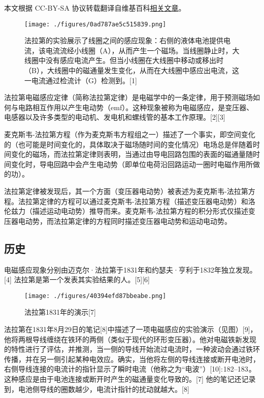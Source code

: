 
本文根据 CC-BY-SA 协议转载翻译自维基百科\href{https://en.wikipedia.org/wiki/Faraday\%27s_law_of_induction}{相关文章}。

\begin{figure}[ht]
\centering
\texttt{[image: ./figures/0ad787ae5c515839.png]}
\caption{法拉第的实验展示了线圈之间的感应现象：右侧的液体电池提供电流，该电流流经小线圈（A），从而产生一个磁场。当线圈静止时，大线圈中没有感应电流产生。但当小线圈在大线圈中移动或移出时（B），大线圈中的磁通量发生变化，从而在大线圈中感应出电流，这一电流通过检流计（G）检测到。[1]} \label{fig_FLDL_1}
\end{figure}
法拉第电磁感应定律（简称法拉第定律）是电磁学中的一条定律，用于预测磁场如何与电路相互作用以产生电动势（emf）。这种现象被称为电磁感应，是变压器、电感器以及许多类型的电动机、发电机和螺线管的基本工作原理。[2][3]

麦克斯韦-法拉第方程（作为麦克斯韦方程组之一）描述了一个事实，即空间变化的（也可能是时间变化的，具体取决于磁场随时间的变化情况）电场总是伴随着时间变化的磁场，而法拉第定律则表明，当通过由导电回路包围的表面的磁通量随时间变化时，导电回路中会产生电动势（即单位电荷沿回路运动一圈时电磁作用所做的功）。

法拉第定律被发现后，其一个方面（变压器电动势）被表述为麦克斯韦-法拉第方程。法拉第定律的方程可以通过麦克斯韦-法拉第方程（描述变压器电动势）和洛伦兹力（描述运动电动势）推导而来。麦克斯韦-法拉第方程的积分形式仅描述变压器电动势，而法拉第定律的方程同时描述变压器电动势和运动电动势。
\subsection{历史}  
电磁感应现象分别由迈克尔·法拉第于1831年和约瑟夫·亨利于1832年独立发现。[4] 法拉第是第一个发表其实验结果的人。[5][6]
\begin{figure}[ht]
\centering
\texttt{[image: ./figures/40394efd87bbeabe.png]}
\caption{法拉第1831年的演示[7]} \label{fig_FLDL_2}
\end{figure}
法拉第在1831年8月29日的笔记[8]中描述了一项电磁感应的实验演示（见图）[9]，他将两根导线缠绕在铁环的两侧（类似于现代的环形变压器）。他对电磁铁新发现的特性进行了评估，并推测，当一侧的导线开始流过电流时，一种波动会通过铁环传播，并在另一侧引起某种电效应。确实，当他将左侧的导线连接或断开电池时，右侧导线连接的电流计的指针显示了瞬时电流（他称之为“电波”）[10]: 182–183 。这种感应是由于电池连接或断开时产生的磁通量变化导致的。[7] 他的笔记还记录到，电池侧导线的圈数越少，电流计指针的扰动就越大。[8]

